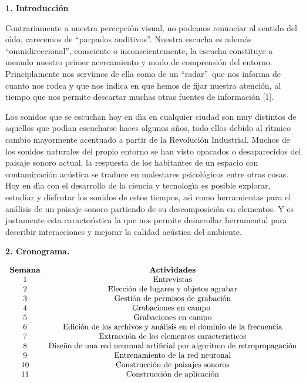 \textbf{1. Introducci\'{o}n}

Contrariamente a nuestra percepci\'{o}n visual, no podemos renunciar al
sentido del o\'{\i}do, carecemos de \textquotedblleft parpados
auditivos\textquotedblright . Nuestra escucha es adem\'{a}s
\textquotedblleft omnidireccional\textquotedblright , consciente o
inconscientemente, la escucha constituye a menudo nuestro primer
acercamiento y modo de comprensi\'{o}n del entorno. Principlamente nos
servimos de ella como de un \textquotedblleft radar\textquotedblright\ que
nos informa de cuanto nos rodea y que nos indica en que hemos de fijar
nuestra atenci\'{o}n, al tiempo que nos permite descartar muchas otras
fuentes de informaci\'{o}n [1].

Los sonidos que se escuchan hoy en d\'{\i}a en cualquier ciudad son muy
distintos de aquellos que pod\'{\i}an escucharse haces algunos a\~{n}os,
todo ellos debido al r\'{\i}tmico cambio mayormente acentuado a partir de la
Revoluci\'{o}n Industrial. Muchos de los sonidos naturales del propio
entorno se han visto opacados o desaparecidos del paisaje sonoro actual, la
respuesta de los habitantes de un espacio con contaminaci\'{o}n ac\'{u}stica
se traduce en malestares psicol\'{o}gicos entre otras cosas. Hoy en d\'{\i}a
con el desarrollo de la ciencia y tecnolog\'{\i}a es posible explorar,
estudiar y disfrutar los sonidos de estos tiempos, as\'{\i} como
herramientas para el an\'{a}lisis de un paisaje sonoro partiendo de su
descomposici\'{o}n en elementos. Y es justamente esta caracter\'{\i}stica la
que nos permite desarrollar herramental para describir interacciones y
mejorar la calidad ac\'{u}stica del ambiente.

\textbf{2. Cronograma.}

$%
\begin{array}{cc}
\text{\textbf{Semana}} & \text{\textbf{Actividades}} \\
\text{1} & \text{Entrevistas} \\
\text{2} & \text{Elecci\'{o}n de lugares y objetos agrabar} \\
\text{3} & \text{Gesti\'{o}n de permisos de grabaci\'{o}n} \\
\text{4} & \text{Grabaciones en campo } \\
\text{5} & \text{Grabaciones en campo} \\
\text{6} & \text{Edici\'{o}n de los archivos y an\'{a}lisis en el dominio de
la frecuencia} \\
\text{7} & \text{Extracci\'{o}n de los elementos caracter\'{\i}sticos} \\
\text{8} & \text{Dise\~{n}o de una red neuronal artificial por algoritmo de
retropropagaci\'{o}n} \\
\text{9} & \text{Entrenamiento de la red neuronal} \\
\text{10} & \text{Construcci\'{o}n de paisajes sonoros} \\
\text{11} & \text{Construcci\'{o}n de aplicaci\'{o}n}%
\end{array}%
$

